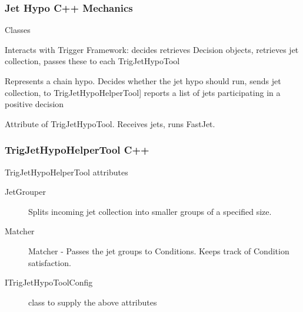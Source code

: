 \documentclass{beamer}
\begin{document}
 \frame
{
\frametitle{Jet Hypo C++ Mechanics}

\begin{block}{Classes}
\begin{description}
\item[TrigJetHypoAlg] Interacts with Trigger Framework: decides
retrieves Decision objects, retrieves jet collection, passes these to each TrigJetHypoTool
\item[TrigJetHypoTool] Represents a chain hypo. Decides
whether the jet hypo should run, sends jet collection, to  TrigJetHypoHelperTool]  
reports a list of jets participating in a positive decision
\item[TrigJetHypoHelperTool] Attribute of TrigJetHypoTool. Receives jets, runs FastJet.
\item 
\end{description}
\end{block}
}

\frame
{
\frametitle{TrigJetHypoHelperTool C++}
\begin{block}{TrigJetHypoHelperTool attributes}
\begin{description}
\item[JetGrouper ]  Splits incoming jet collection into smaller groups of a specified size.
\item[Matcher ]  Matcher - Passes the jet groups to Conditions. Keeps track of Condition satisfaction.
\item[ITrigJetHypoToolConfig] class to supply the above attributes
\end{description}
\end{block}
}

\end{document}
